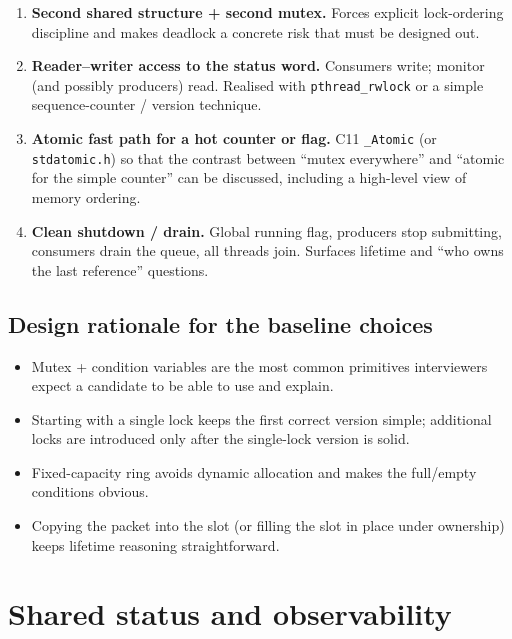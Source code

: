 \documentclass[11pt,a4paper]{article}
\begin{document}
\begin{enumerate}[leftmargin=*]
    \item \textbf{Second shared structure + second mutex.}  
          Forces explicit lock-ordering discipline and makes deadlock a concrete risk that must be designed out.

    \item \textbf{Reader--writer access to the status word.}  
          Consumers write; monitor (and possibly producers) read.  
          Realised with \texttt{pthread\_rwlock} or a simple sequence-counter / version technique.

    \item \textbf{Atomic fast path for a hot counter or flag.}  
          C11 \texttt{\_Atomic} (or \texttt{stdatomic.h}) so that the contrast between ``mutex everywhere'' and ``atomic for the simple counter'' can be discussed, including a high-level view of memory ordering.

    \item \textbf{Clean shutdown / drain.}  
          Global running flag, producers stop submitting, consumers drain the queue, all threads join.  
          Surfaces lifetime and ``who owns the last reference'' questions.
\end{enumerate}

\subsection{Design rationale for the baseline choices}

\begin{itemize}[leftmargin=*]
    \item Mutex + condition variables are the most common primitives interviewers expect a candidate to be able to use and explain.
    \item Starting with a single lock keeps the first correct version simple; additional locks are introduced only after the single-lock version is solid.
    \item Fixed-capacity ring avoids dynamic allocation and makes the full/empty conditions obvious.
    \item Copying the packet into the slot (or filling the slot in place under ownership) keeps lifetime reasoning straightforward.
\end{itemize}

\section{Shared status and observability}
\label{sec:status}
\end{document}
